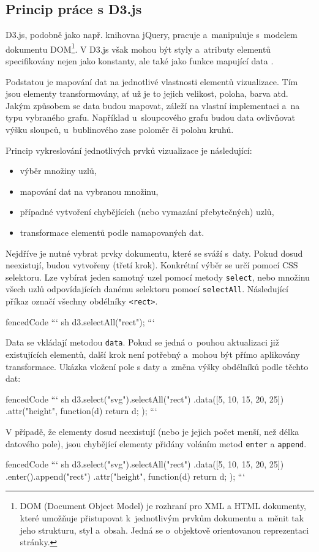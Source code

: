 \documentclass[
  digital, %
  oneside, %
  table,   %
  nolof,     %
  nolot,     %
]{fithesis3}
\begin{document}
\subsection{Princip práce s D3.js}
D3.js, podobně jako např. knihovna jQuery, pracuje a~manipuluje s~modelem dokumentu DOM\footnote{DOM (Document Object Model) je rozhraní pro XML a HTML dokumenty, které umožňuje přistupovat k~jednotlivým prvkům dokumentu a~měnit tak jeho strukturu, styl a~obsah. Jedná se o~objektově orientovanou reprezentaci stránky.}. V D3.js však mohou být styly a~atributy elementů specifikovány nejen jako konstanty, ale také jako funkce mapující data \cite{d3jsorg}.\par
Podstatou je mapování dat na jednotlivé vlastnosti elementů vizualizace. Tím jsou elementy transformovány, ať už je to jejich velikost, poloha, barva atd. Jakým způsobem se data budou mapovat, záleží na vlastní implementaci a~na typu vybraného grafu. Například u~sloupcového grafu budou data ovlivňovat výšku sloupců, u~bublinového zase poloměr či polohu kruhů. \cite{interactiveVisualizationBook}\par
Princip vykreslování jednotlivých prvků vizualizace je následující:
\begin{itemize}
  \item výběr množiny uzlů,
  \item mapování dat na vybranou množinu,
  \item případné vytvoření chybějících (nebo vymazání přebytečných) uzlů,
  \item transformace elementů podle namapovaných dat.
\end{itemize}
Nejdříve je nutné vybrat prvky dokumentu, které se sváží s~daty. Pokud dosud neexistují, budou vytvořeny (třetí krok). Konkrétní výběr se určí pomocí CSS selektoru.
Lze vybírat jeden samotný uzel pomocí metody \verb|select|, nebo množinu všech uzlů odpovídajících danému selektoru pomocí \verb|selectAll|. Následující příkaz označí všechny obdélníky \verb|<rect>|.
\begin{markdown*}{
  fencedCode
}
``` sh
	d3.selectAll("rect"); 
```
\end{markdown*}
Data se vkládají metodou \verb|data|. Pokud se jedná o~pouhou aktualizaci již existujících elementů, další krok není potřebný a~mohou být přímo aplikovány transformace. Ukázka vložení pole s daty a~změna výšky obdélníků podle těchto dat:
\begin{markdown*}{
  fencedCode
}
``` sh
	d3.select("svg").selectAll("rect")
	  .data([5, 10, 15, 20, 25])
	  .attr("height", function(d) { return d; });
```
\end{markdown*}
V případě, že elementy dosud neexistují (nebo je jejich počet menší, než délka datového pole), jsou chybějící elementy přidány voláním metod \verb|enter| a \verb|append|.
\begin{markdown*}{
  fencedCode
}
``` sh
	d3.select("svg").selectAll("rect")
	  .data([5, 10, 15, 20, 25])
	  .enter().append("rect")
	  .attr("height", function(d) { return d; });
```
\end{markdown*}
\end{document}
